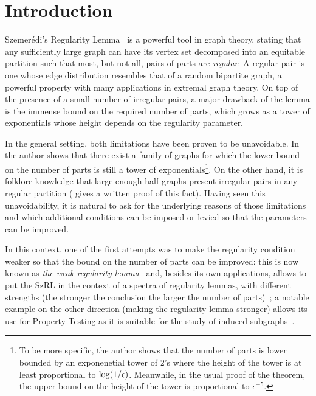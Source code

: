 \section{Introduction} \label{sec:introduction}

    Szemer\'edi's Regularity Lemma~\cite{regular_partitions_of_graphs} is a powerful tool in graph theory,
    stating that any sufficiently large graph can have its vertex set decomposed into an equitable partition such that most,
    but not all, pairs of parts are \emph{regular}.
    A regular pair is one whose edge distribution resembles that of a random bipartite graph, a powerful property with many
    applications in extremal graph theory.
    On top of the presence of a small number of irregular pairs, a major drawback of the lemma is the immense
    bound on the required number of parts, which grows as a tower of exponentials whose height depends on the regularity parameter.

    In the general setting, both limitations have been proven to be unavoidable.
    In~\cite{lower_bounds_of_tower_type_for_szeremedis_uniformity_lemma} the author shows that there exist a family of graphs
    for which the lower bound on the number of parts is still a tower of exponentials\footnote{
    To be more specific, the author shows that the number of parts is lower bounded by an exponenetial tower of $2$'s where
        the height of the tower is at least proportional to $\log( 1/\epsilon )$.
        Meanwhile, in the usual proof of the theorem, the upper bound on the height of the tower is proportional to
        $\epsilon^{-5}$.
    }.
    On the other hand, it is folklore knowledge that large-enough half-graphs present irregular pairs in any
    regular partition (\cite{irregular_pairs_in_half_graphs_szemeredi_regularity} gives a written proof of this fact).
    Having seen this unavoidability, it is natural to ask for the underlying reasons of those limitations and which
    additional conditions can be imposed or levied so that the parameters can be improved.

    In this context, one of the first attempts was to make the regularity condition weaker so that the bound on the
    number of parts can be improved: this is now known as
    \emph{the weak regularity lemma}~\cite{quick_approximation_to_matrices_and_applications} and,
    besides its own applications, allows to put the SzRL in the context of a spectra of regularity lemmas, with
    different strengths (the stronger the conclusion the larger the number of
    parts)~\cite{szemeredis_lemma_for_the_analyst, regularity_partitions_and_the_topology_of_graphons};
    a notable example on the other direction (making the regularity lemma stronger) allows its use for Property Testing
    as it is suitable for the study of induced subgraphs~\cite{efficient_testing_of_large_graphs}.

